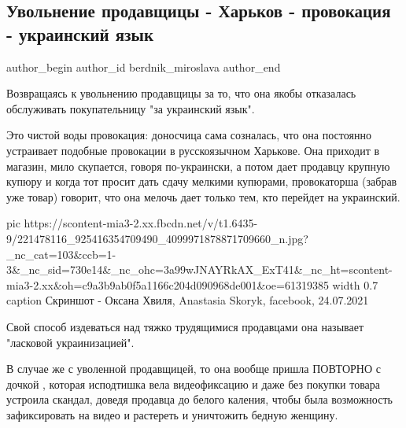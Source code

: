  
 
 
 
 
 
\subsection{Увольнение продавщицы - Харьков - провокация - украинский язык}
\label{sec:27_07_2021.fb.berdnik_miroslava.1.harkov_prodavschica_uvolnenie_jazyk}
 
\ifcmt
 author_begin
   author_id berdnik_miroslava
 author_end
\fi

Возвращаясь к увольнению продавщицы за то, что она якобы отказалась обслуживать
покупательницу "за украинский язык". 

Это чистой воды провокация: доносчица сама созналась, что она постоянно
устраивает подобные провокации в русскоязычном Харькове. Она приходит в
магазин, мило скупается, говоря по-украински, а потом дает продавцу крупную
купюру и когда тот просит дать сдачу мелкими купюрами, провокаторша (забрав уже
товар) говорит, что она мелочь дает только тем, кто перейдет на украинский.

\ifcmt
  pic https://scontent-mia3-2.xx.fbcdn.net/v/t1.6435-9/221478116_925416354709490_4099971878871709660_n.jpg?_nc_cat=103&ccb=1-3&_nc_sid=730e14&_nc_ohc=3a99wJNAYRkAX_ExT41&_nc_ht=scontent-mia3-2.xx&oh=c9a3b9ab0f5a1166c204d090968de001&oe=61319385
  width 0.7
	caption Скриншот - Оксана Хвиля, Anastasia Skoryk, facebook, 24.07.2021
\fi

Свой способ издеваться над тяжко трудящимися продавцами она называет "ласковой
украинизацией".

В случае же с уволенной продавщицей, то она вообще пришла ПОВТОРНО с дочкой ,
которая исподтишка вела видеофиксацию и даже без покупки товара устроила
скандал, доведя продавца до белого каления, чтобы была возможность
зафиксировать на видео и растереть и уничтожить бедную женщину.

